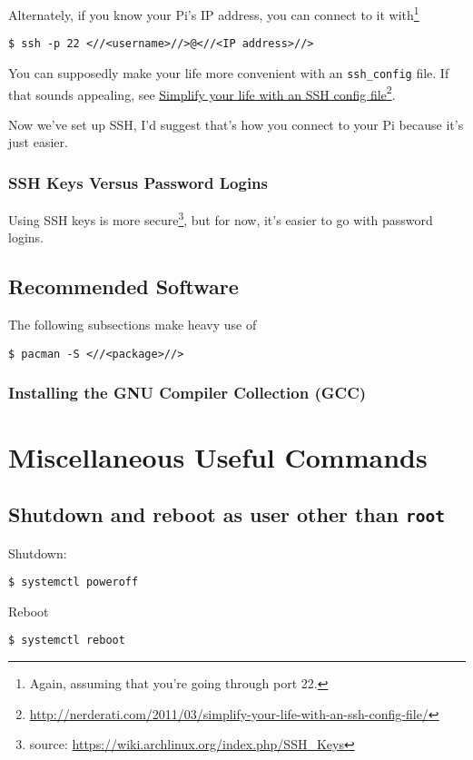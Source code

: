 \documentclass[12pt,letterpaper]{article}
\begin{document}
Alternately, if you know your Pi's IP address, you can connect to it with\footnote{Again, assuming that you're going through port 22.}
\begin{lstlisting}
$ ssh -p 22 <//<username>//>@<//<IP address>//>
\end{lstlisting}

You can supposedly make your life more convenient with an \lstinline{ssh_config} file.  If that sounds appealing, see \href{http://nerderati.com/2011/03/simplify-your-life-with-an-ssh-config-file/}{Simplify your life with an SSH config file}\footnote{\url{http://nerderati.com/2011/03/simplify-your-life-with-an-ssh-config-file/}}.

Now we've set up SSH, I'd suggest that's how you connect to your Pi because it's just easier.

%


\subsubsection{SSH Keys Versus Password Logins}
Using SSH keys is more secure\footnote{source: \url{https://wiki.archlinux.org/index.php/SSH_Keys}}, but for now, it's easier to go with password logins.

\subsection{Recommended Software}

The following subsections make heavy use of
\begin{lstlisting}
$ pacman -S <//<package>//>
\end{lstlisting}

\subsubsection{Installing the GNU Compiler Collection (GCC)}




\section{Miscellaneous Useful Commands}

\subsection{Shutdown and reboot as user other than \lstinline{root}}
Shutdown:
\begin{lstlisting}
$ systemctl poweroff
\end{lstlisting}

Reboot
\begin{lstlisting}
$ systemctl reboot
\end{lstlisting}
\end{document}

